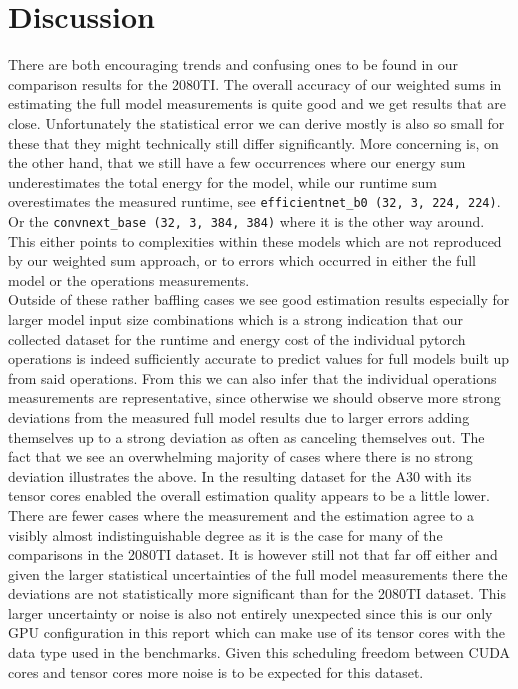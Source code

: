 \documentclass[conference]{IEEEtran}
\begin{document}
\section{Discussion}
There are both encouraging trends and confusing ones to be found in our comparison results for the 2080TI. The overall accuracy of our weighted sums in estimating the full model measurements is quite good and we get results that are close. Unfortunately the statistical error we can derive mostly is also so small for these that they might technically still differ significantly. More concerning is, on the other hand, that we still have a few occurrences where our energy sum underestimates the total energy for the model, while our runtime sum overestimates the measured runtime, see \texttt{efficientnet\_b0 (32, 3, 224, 224)}. Or the \texttt{convnext\_base (32, 3, 384, 384)} where it is the other way around. 
This either points to complexities within these models which are not reproduced by our weighted sum approach, or to errors which occurred in either the full model or the operations measurements.\\
Outside of these rather baffling cases we see good estimation results especially for larger model input size combinations which is a strong indication that our collected dataset for the runtime and energy cost of the individual pytorch operations is indeed sufficiently accurate to predict values for full models built up from said operations. From this we can also infer that the individual operations measurements are representative, since otherwise we should observe more strong deviations from the measured full model results due to larger errors adding themselves up to a strong deviation as often as canceling themselves out. The fact that we see an overwhelming majority of cases where there is no strong deviation illustrates the above.
In the resulting dataset for the A30 with its tensor cores enabled the overall estimation quality appears to be a little lower. There are fewer cases where the measurement and the estimation agree to a visibly almost indistinguishable degree as it is the case for many of the comparisons in the 2080TI dataset. It is however still not that far off either and given the larger statistical uncertainties of the full model measurements there the deviations are not statistically more significant than for the 2080TI dataset. This larger uncertainty or noise is also not entirely unexpected since this is our only GPU configuration in this report which can make use of its tensor cores with the data type used in the benchmarks. Given this scheduling freedom between CUDA cores and tensor cores more noise is to be expected for this dataset. \\
\end{document}
